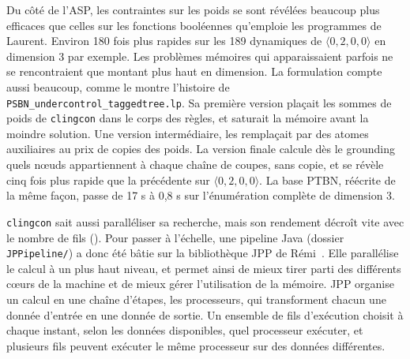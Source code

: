 \documentclass[12pt, a4paper]{article}
\begin{document}
Du côté de l'ASP, les contraintes sur les poids se sont révélées beaucoup plus efficaces que celles sur les fonctions booléennes qu'emploie les programmes de Laurent. Environ 180 fois plus rapides sur les 189 dynamiques de $\langle 0,2,0,0\rangle$ en dimension 3 par exemple. Les problèmes mémoires qui apparaissaient parfois ne se rencontraient que montant plus haut en dimension.
La formulation compte aussi beaucoup, comme le montre l'histoire de \texttt{PSBN\_undercontrol\_taggedtree.lp}.
Sa première version plaçait les sommes de poids de \texttt{clingcon} dans le corps des règles, et saturait la mémoire avant la moindre solution.
Une version intermédiaire, les remplaçait par des atomes auxiliaires au prix de copies des poids.
La version finale calcule dès le grounding quels nœuds appartiennent à chaque chaîne de coupes, sans copie, et se révèle cinq fois plus rapide que la précédente sur $\langle 0,2,0,0\rangle$.
La base PTBN, réécrite de la même façon, passe de 17 s à 0,8 s sur l'énumération complète de dimension 3.

\texttt{clingcon} sait aussi paralléliser sa recherche, mais son rendement décroît vite avec le nombre de fils ().
Pour passer à l'échelle, une pipeline Java (dossier \texttt{JPPipeline/}) a donc été bâtie sur la bibliothèque JPP de Rémi~\cite{segretain2023}.
Elle parallélise le calcul à un plus haut niveau, et permet ainsi de mieux tirer parti des différents cœurs de la machine et de mieux gérer l'utilisation de la mémoire.
JPP organise un calcul en une chaîne d'étapes, les processeurs, qui transforment chacun une donnée d'entrée en une donnée de sortie.
Un ensemble de fils d'exécution choisit à chaque instant, selon les données disponibles, quel processeur exécuter, et plusieurs fils peuvent exécuter le même processeur sur des données différentes.
\end{document}
